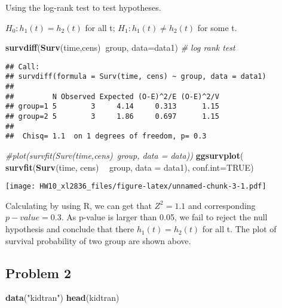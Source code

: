 \documentclass[]{article}
\newenvironment{Shaded}{\begin{snugshade}}{\end{snugshade}}
\newcommand{\KeywordTok}[1]{\textcolor[rgb]{0.13,0.29,0.53}{\textbf{#1}}}
\newcommand{\DataTypeTok}[1]{\textcolor[rgb]{0.13,0.29,0.53}{#1}}
\newcommand{\StringTok}[1]{\textcolor[rgb]{0.31,0.60,0.02}{#1}}
\newcommand{\CommentTok}[1]{\textcolor[rgb]{0.56,0.35,0.01}{\textit{#1}}}
\newcommand{\OtherTok}[1]{\textcolor[rgb]{0.56,0.35,0.01}{#1}}
\newcommand{\OperatorTok}[1]{\textcolor[rgb]{0.81,0.36,0.00}{\textbf{#1}}}
\newcommand{\NormalTok}[1]{#1}
\begin{document}
Using the log-rank test to test hypotheses.

\(H_0: h_1(t) = h_2(t)\) for all t; \(H_1: h_1(t) \neq h_2(t)\) for some
t.

\begin{Shaded}
\begin{Highlighting}[]
\KeywordTok{survdiff}\NormalTok{(}\KeywordTok{Surv}\NormalTok{(time,cens)}\OperatorTok{~}\NormalTok{group, }\DataTypeTok{data=}\NormalTok{data1) }\CommentTok{# log rank test}
\end{Highlighting}
\end{Shaded}

\begin{verbatim}
## Call:
## survdiff(formula = Surv(time, cens) ~ group, data = data1)
## 
##         N Observed Expected (O-E)^2/E (O-E)^2/V
## group=1 5        3     4.14     0.313      1.15
## group=2 5        3     1.86     0.697      1.15
## 
##  Chisq= 1.1  on 1 degrees of freedom, p= 0.3
\end{verbatim}

\begin{Shaded}
\begin{Highlighting}[]
\CommentTok{#plot(survfit(Surv(time,cens)~group, data = data)) }
\KeywordTok{ggsurvplot}\NormalTok{( }\KeywordTok{survfit}\NormalTok{(}\KeywordTok{Surv}\NormalTok{(time, cens) }\OperatorTok{~}\StringTok{ }\NormalTok{group, }\DataTypeTok{data =}\NormalTok{ data1), }\DataTypeTok{conf.int=}\OtherTok{TRUE}\NormalTok{)}
\end{Highlighting}
\end{Shaded}

\texttt{[image: HW10\_xl2836\_files/figure-latex/unnamed-chunk-3-1.pdf]}

Calculating by using R, we can get that \(Z^2 = 1.1\) and corresponding
\(p-value = 0.3\). As p-value is larger than 0.05, we fail to reject the
null hypothesis and conclude that there \(h_1(t) = h_2(t)\) for all t.
The plot of survival probability of two group are shown above.

\subsection{Problem 2}\label{problem-2}

\begin{Shaded}
\begin{Highlighting}[]
\KeywordTok{data}\NormalTok{(}\StringTok{"kidtran"}\NormalTok{)}
\KeywordTok{head}\NormalTok{(kidtran)}
\end{Highlighting}
\end{Shaded}
\end{document}

